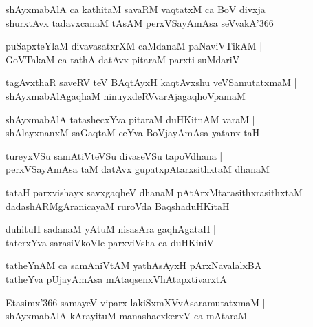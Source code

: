 \begin{shloka}
shAyxmabAlA ca kathitaM savaRM vaqtatxM ca BoV divxja |\\
shurxtAvx tadavxcanaM tAsAM perxVSayAmAsa seVvakA\char'366
\end{shloka}

\begin{shloka}
puSapxteYlaM divavasatxrXM caMdanaM paNaviVTikAM |\\
GoVTakaM ca tathA datAvx pitaraM parxti suMdariV
\end{shloka}

\begin{shloka}
tagAvxthaR saveRV teV BAqtAyxH kaqtAvxshu veVSamutatxmaM |\\
shAyxmabAlAgaqhaM ninuyxdeRVvarAjagaqhoVpamaM
\end{shloka}

\begin{shloka}
shAyxmabAlA tatashecxYva pitaraM duHKitnAM varaM |\\
shAlayxnanxM saGaqtaM ceYva BoVjayAmAsa yatanx taH
\end{shloka}

\begin{shloka}
tureyxVSu samAtiVteVSu divaseVSu tapoVdhana |\\
perxVSayAmAsa taM datAvx gupatxpAtarxsithxtaM dhanaM
\end{shloka}

\begin{shloka}
tataH parxvishayx savxgaqheV dhanaM pAtArxMtarasithxrasithxtaM |\\
dadashARMgAranicayaM ruroVda BaqshaduHKitaH
\end{shloka}

\begin{shloka}
duhituH sadanaM yAtuM nisasAra gaqhAgataH |\\
taterxYva sarasiVkoVle parxviVsha ca duHKiniV
\end{shloka}

\begin{shloka}
tatheYnAM ca samAniVtAM yathAsAyxH pArxNavalalxBA |\\
tatheYva pUjayAmAsa mAtaqsenxVhAtapxtivarxtA
\end{shloka}

\begin{shloka}
Etasimx\char'366 samayeV viparx lakiSxmXVvAsaramutatxmaM |\\
shAyxmabAlA kArayituM manashacxkerxV ca mAtaraM
\end{shloka}


